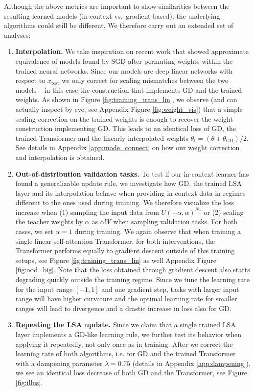 \documentclass{article}
\theoremstyle{plain}
\theoremstyle{definition}
\theoremstyle{remark}
\begin{document}
Although the above metrics are important to show similarities between the resulting learned models (in-context vs.~gradient-based), the underlying algorithms could still be different. We therefore carry out an extended set of analyses:
\begin{enumerate}
 \item \textbf{Interpolation.}  We take inspiration on recent work \citep{permute2, permute1} that showed approximate equivalence of models found by SGD after permuting weights within the trained neural networks. Since our models are deep linear networks with respect to $x_{\text{test}}$ we only correct for scaling mismatches between the two models -- in this case the construction that implements GD and the trained weights. As shown in Figure \ref{fig:training_trans_lin}, we observe (and can actually inspect by eye, see Appendix Figure \ref{fig:weight_vis}) that a simple scaling correction on the trained weights is enough to recover the weight construction implementing GD. This leads to an identical loss of GD, the trained Transformer and the linearly interpolated weights $\theta_{\text{I}} = (\theta + \theta_{\text{GD}})/2$. See details in Appendix \ref{app:mode_connect} on how our weight correction and interpolation is obtained.

\item \textbf{Out-of-distribution validation tasks.} To test if our in-context learner has found a generalizable update rule, we investigate how GD, the trained LSA layer and its interpolation behave when providing in-context data in regimes different to the ones used during training. We therefore visualize the loss increase when (1) sampling the input data from $U(-\alpha, \alpha)^{N_x}$ or (2) scaling the teacher weights by $\alpha$ as $\alpha W$ when sampling validation tasks. For both cases, we set $\alpha=1$ during training. We again observe that when training a single linear self-attention Transformer, for both interventions, the Transformer performs equally to gradient descent outside of this training setups, see Figure \ref{fig:training_trans_lin} as well Appendix Figure \ref{fig:ood_big}. Note that the loss obtained through gradient descent also starts degrading quickly outside the training regime. Since we tune the learning rate for the input range $[-1, 1]$ and one gradient step, tasks with larger input range will have higher curvature and the optimal learning rate for smaller ranges will lead to divergence and a drastic increase in loss also for GD.

\item \textbf{Repeating the LSA update.}  Since we claim that a single trained LSA layer implements a GD-like learning rule, we further test its behavior when applying it repeatedly, not only once as in training.
After we correct the learning rate of both algorithms, i.e. for GD and the trained Transformer with a dampening parameter $\lambda = 0.75$ (details in Appendix \ref{app:dampening}), we see an identical loss decrease of both GD and the Transformer, see Figure \ref{fig:illus}. 
\end{enumerate}
\end{document}

